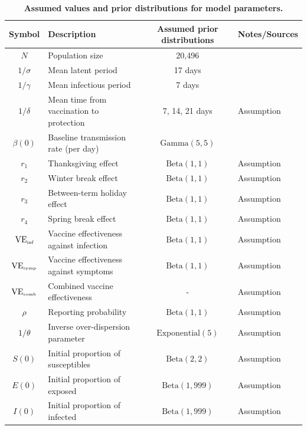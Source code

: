 \documentclass[12pt]{article}
\begin{document}
\begin{table}[!t]
\begin{center}
\scriptsize
\begin{tabular}{c|p{6cm}|c|l}
Symbol & Description & Assumed prior distributions & Notes/Sources\\
\hline
$N$ & Population size & 20,496 & \citep{cardemil2017effectiveness} \\
$1/\sigma$ & Mean latent period & 17 days & \cite{galazka1999mumps,lewnard2018vaccine} \\
$1/\gamma$ & Mean infectious period & 7 days & \cite{galazka1999mumps,lewnard2018vaccine} \\
$1/\delta$ & Mean time from vaccination to protection & 7, 14, 21 days & Assumption \\
$\beta(0)$ & Baseline transmission rate (per day) & $\textrm{Gamma}(5, 5)$ & \cite{lewnard2018vaccine} \\
$r_1$ & Thanksgiving effect & $\textrm{Beta}(1, 1)$ & Assumption \\
$r_2$ & Winter break effect & $\textrm{Beta}(1, 1)$ & Assumption \\
$r_3$ & Between-term holiday effect & $\textrm{Beta}(1, 1)$ & Assumption \\
$r_4$ & Spring break effect & $\textrm{Beta}(1, 1)$ & Assumption \\
$\mathrm{VE}_{\textrm{\tiny{inf}}}$ & Vaccine effectiveness against infection & $\textrm{Beta}(1, 1)$ & Assumption \\
$\mathrm{VE}_{\textrm{\tiny{symp}}}$ & Vaccine effectiveness against symptoms & $\textrm{Beta}(1, 1)$ & Assumption \\
$\mathrm{VE}_{\textrm{\tiny{comb}}}$ & Combined vaccine effectiveness & - & Assumption \\
$\rho$ & Reporting probability & $\textrm{Beta}(1, 1)$ & Assumption \\
$1/\theta$ & Inverse over-dispersion parameter & $\textrm{Exponential}(5)$ & Assumption \\
$S(0)$ & Initial proportion of susceptibles & $\textrm{Beta}(2, 2)$ & Assumption \\
$E(0)$ & Initial proportion of exposed & $\textrm{Beta}(1, 999)$ & Assumption \\
$I(0)$ & Initial proportion of infected & $\textrm{Beta}(1, 999)$ & Assumption \\
\hline
\end{tabular}
\caption{
\textbf{Assumed values and prior distributions for model parameters.}
}
\end{center}
\end{table}
\end{document}
